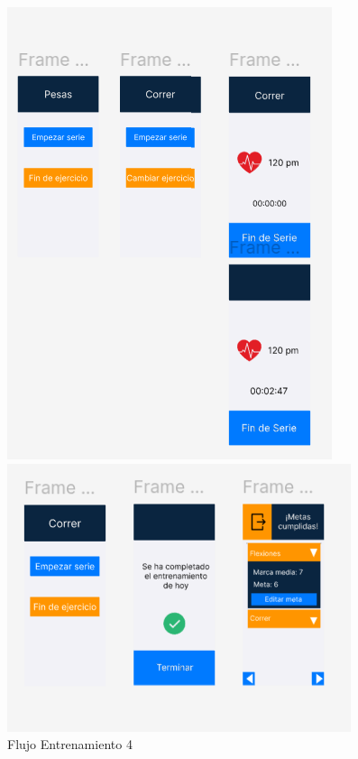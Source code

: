 \begin{figure}[H]
  \begin{minipage}[b]{0.4\textwidth}
    \centering
    \includegraphics[width=\textwidth]{fotos/FE4.png}
    \caption{Flujo Entrenamiento 4}
    \label{fig:Flujo Entrenamiento 4}
  \end{minipage}
  \begin{minipage}[b]{0.4\textwidth}
    \centering
    \includegraphics[width=\textwidth]{fotos/FE5.png}

\end{minipage}
\end{figure}
